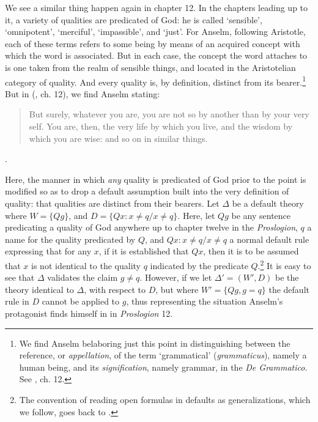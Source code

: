 \documentclass[]{birkjour}
\begin{document}
We see a similar thing happen again in chapter 12. In the chapters leading up to it, a variety of qualities are predicated of God: he is called `sensible', `omnipotent', `merciful', `impassible', and `just'. For Anselm, following Aristotle, each of these terms refers to some being by means of an acquired concept with which the word is associated. But in each case, the concept the word attaches to is one taken from the realm of sensible things, and located in the Aristotelian category of quality. And every quality is, by definition, distinct from its bearer.\footnote{We find Anselm belaboring just this point in distinguishing between the reference, or \textit{appellation}, of the term `grammatical' (\textit{grammaticus}), namely a human being, and its \textit{signification}, namely grammar, in the \textit{De Grammatico}. See \cite{Anselm1974}, ch. 12.} But in (\cite{AnselmPros}, ch. 12), we find Anselm stating:
\begin{quote}
But surely, whatever you are, you are not so by another than by your very self. You are, then, the very life by which you live, and the wisdom by which you are wise: and so on in similar things.
\end{quote}.
	
Here, the manner in which \textit{any} quality is predicated of God prior to the point is modified so as to drop a default assumption built into the very definition of quality: that qualities are distinct from their bearers. Let $\Delta$ be a default theory where $W = \{Qg\}$, and $D = \{Qx: x \ne q/ x \ne q\}$. Here, let $Qg$ be any sentence predicating a quality of God anywhere up to chapter twelve in the \textit{Proslogion}, $q$ a name for the quality predicated by $Q$, and $Qx: x \ne q/ x \ne q$ a normal default rule expressing that for any $x$, if it is established that $Qx$, then it is to be assumed that $x$ is not identical to the quality $q$ indicated by the predicate $Q$.\footnote{The convention of reading open formulas in defaults as generalizations, which we follow, goes back to \cite{Reiter1980}.} It is easy to see that $\Delta$ validates the claim $g \ne q$. However, if we let $\Delta' = (W', D)$ be the theory identical to $\Delta$, with respect to $D$, but where $W' = \{Qg, g = q\}$ the default rule in $D$ cannot be applied to $g$, thus representing the situation Anselm's protagonist finds himself in in \textit{Proslogion} 12.
\end{document}
